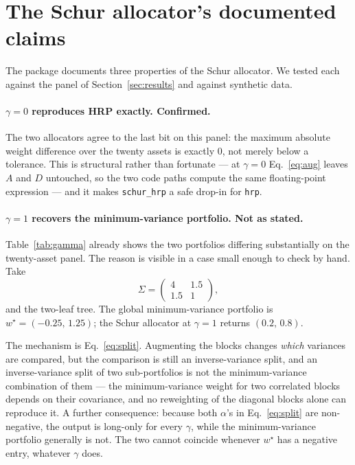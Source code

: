 \documentclass[11pt,a4paper]{article}
\newcommand{\code}[1]{\texttt{#1}}
\begin{document}
\appendix

\section{The Schur allocator's documented claims}
\label{app:claims}

The package documents three properties of the Schur allocator. We tested each against the panel of Section~\ref{sec:results} and against synthetic data.

\paragraph{$\gamma=0$ reproduces HRP exactly. Confirmed.}
The two allocators agree to the last bit on this panel: the maximum absolute
weight difference over the twenty assets is exactly $0$, not merely below a
tolerance. This is structural rather than fortunate --- at $\gamma=0$
Eq.~\eqref{eq:aug} leaves $A$ and $D$ untouched, so the two code paths compute
the same floating-point expression --- and it makes \code{schur\_hrp} a safe
drop-in for \code{hrp}.

\paragraph{$\gamma=1$ recovers the minimum-variance portfolio. Not as stated.}
Table~\ref{tab:gamma} already shows the two portfolios differing substantially
on the twenty-asset panel. The reason is visible in a case small enough to check
by hand. Take
\begin{equation}
  \Sigma = \begin{pmatrix} 4 & 1.5 \\ 1.5 & 1 \end{pmatrix},
\end{equation}
and the two-leaf tree. The global minimum-variance portfolio is
$w^{\star} = (-0.25,\, 1.25)$; the Schur allocator at $\gamma=1$ returns
$(0.2,\, 0.8)$.

The mechanism is Eq.~\eqref{eq:split}. Augmenting the blocks changes
\emph{which} variances are compared, but the comparison is still an
inverse-variance split, and an inverse-variance split of two sub-portfolios is
not the minimum-variance combination of them --- the minimum-variance weight for
two correlated blocks depends on their covariance, and no reweighting of the
diagonal blocks alone can reproduce it. A further consequence: because both
$\alpha$'s in Eq.~\eqref{eq:split} are non-negative, the output is long-only for
every $\gamma$, while the minimum-variance portfolio generally is not. The two
cannot coincide whenever $w^{\star}$ has a negative entry, whatever $\gamma$
does.
\end{document}
